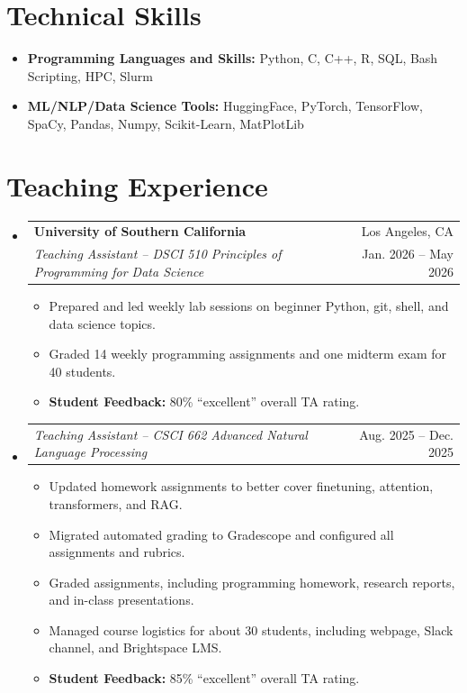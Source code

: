 \documentclass[letterpaper,11pt]{article}
\makeatletter
\newcommand{\resumeItemWithHeader}[2]{
  \item\small{
    \textbf{#1:}{ #2 \vspace{-2pt}}
  }
}
\newcommand{\resumeItem}[1]{
  \item\small{
  {#1 \vspace{-2pt}}
  }
}
\newcommand{\resumeSubheading}[4]{
  \vspace{-1pt} \item
    \begin{tabular*}{0.97\textwidth}{l@{\extracolsep{\fill}}r}
      \textbf{#1} & #2 \\
      \textit{\small#3} & \small #4 \\
      
    \end{tabular*}\vspace{-5pt}
}
\newcommand{\resumeSubheadingSecondTitle}[2]{
  \vspace{-3pt} \item
    \begin{tabular*}{0.97\textwidth}{l@{\extracolsep{\fill}}r}
      \textit{\small#1} & \small #2 \\
    \end{tabular*}\vspace{-5pt}
}
\newcommand{\resumeSubHeadingListStart}{\begin{itemize}[label={}, leftmargin=*]}
\newcommand{\resumeSubHeadingListEnd}{\end{itemize}}
\newcommand{\resumeItemListStart}{\begin{itemize}}
\newcommand{\resumeItemListEnd}{\end{itemize}\vspace{-5pt}}
\makeatother
\begin{document}
  \section{Technical Skills}
 \resumeSubHeadingListStart
   \resumeItemWithHeader{Programming Languages and Skills}{Python, C, C++, R, SQL, Bash Scripting, HPC, Slurm}
   \resumeItemWithHeader{ML/NLP/Data Science Tools}{HuggingFace, PyTorch, TensorFlow, SpaCy, Pandas, Numpy, Scikit-Learn, MatPlotLib}
 \resumeSubHeadingListEnd
  
\section{Teaching Experience}
\resumeSubHeadingListStart
     \resumeSubheading
      {University of Southern California}{Los Angeles, CA}
      {Teaching Assistant -- DSCI 510 Principles of Programming for Data Science}{Jan. 2026 -- May 2026}
      \resumeItemListStart
      \resumeItem{Prepared and led weekly lab sessions on beginner Python, git, shell, and data science topics.}
      \resumeItem{Graded 14 weekly programming assignments and one midterm exam for 40 students.}
      \resumeItemWithHeader{Student Feedback}{80\% ``excellent'' overall TA rating.}
      \resumeItemListEnd
    \resumeSubheadingSecondTitle{Teaching Assistant -- CSCI 662 Advanced Natural Language Processing}{Aug. 2025 -- Dec. 2025}
      \resumeItemListStart
      \resumeItem{Updated homework assignments to better cover finetuning, attention, transformers, and RAG.}
      \resumeItem{Migrated automated grading to Gradescope and configured all assignments and rubrics.}
      \resumeItem{Graded assignments, including programming homework, research reports, and in-class presentations.}
      \resumeItem{Managed course logistics for about 30 students, including webpage, Slack channel, and Brightspace LMS.}
      \resumeItemWithHeader{Student Feedback}{85\% ``excellent'' overall TA rating.}
      \resumeItemListEnd
    \resumeSubHeadingListEnd
\end{document}
